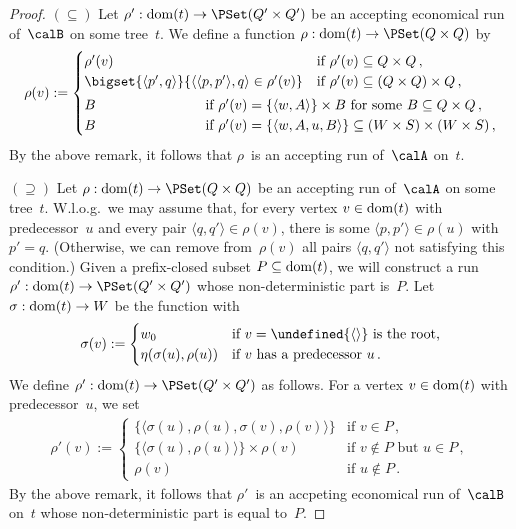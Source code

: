 \documentclass[10pt, fleqn]{scrartcl}
\makeatletter
\newcommand\m@thsm@ller[2]{\mbox{\relscale{0.91}$\m@th#1#2$}}
\let\smaller\undefined
\DeclareRobustCommand\smaller[1]{\relax\ifmmode{\mathpalette\m@thsm@ller{#1}}\else{\relscale{0.91}#1}\fi}
\DeclareRobustCommand*{\dom}{\qopname\relax o{dom}}
\newcommand*{\emptyseq}{\smaller{\langle\rangle}}
\newcommand*{\?}{\kern .08em}
\makeatother
\begin{document}
\begin{proof}
$(\subseteq)$ Let $\rho' : \dom(t) \to \PSet(Q' \times Q')$ be an accepting economical run
of~$\calB$ on some tree~$t$.
We define a function $\rho : \dom(t) \to \PSet(Q \times Q)$ by
\begin{align*}
  \rho(v) :=
    \begin{cases}
      \rho'(v) &\text{if } \rho'(v) \subseteq Q \times Q\,, \\
      \bigset{ \langle p',q\rangle }{ \langle\langle p,p'\rangle,q\rangle \in \rho'(v) }
               &\text{if } \rho'(v) \subseteq (Q \times Q) \times Q\,, \\[0.25em]
      B        &\mkern-144mu\text{if } \rho'(v) = \{\langle w,A\rangle\} \times B
                            \text{ for some } B \subseteq Q \times Q\,, \\
      B        &\mkern-144mu\text{if } \rho'(v) = \{\langle w,A,u,B\rangle\}
                                       \subseteq (W \times S) \times (W \times S)\,,
    \end{cases}
\end{align*}
By the above remark, it follows that $\rho$~is an accepting run of~$\calA$ on~$t$.

$(\supseteq)$
Let $\rho : \dom(t) \to \PSet(Q \times Q)$ be an accepting run of~$\calA$ on some tree~$t$.
W.l.o.g.\ we may assume that, for every vertex $v \in \dom(t)$ with predecessor~$u$
and every pair $\langle q,q'\rangle \in \rho(v)$, there is some $\langle p,p'\rangle \in \rho(u)$
with $p' = q$. (Otherwise, we can remove from~$\rho(v)$ all pairs $\langle q,q'\rangle$
not satisfying this condition.)
Given a prefix-closed subset $P \subseteq \dom(t)$, we will construct a run
$\rho' : \dom(t) \to \PSet(Q' \times Q')$ whose non-deterministic part is~$P$.
Let $\sigma : \dom(t) \to W$ be the function with
\begin{align*}
  \sigma(v) :=
    \begin{cases}
      w_0 &\text{if } v = \emptyseq \text{ is the root,} \\
      \eta(\sigma(u),\rho(u)) &\text{if } v \text{ has a predecessor } u\,.
    \end{cases}
\end{align*}
We define $\rho' : \dom(t) \to \PSet(Q' \times Q')$ as follows.
For a vertex $v \in \dom(t)$ with predecessor~$u$, we set
\begin{align*}
  \rho'(v) :=
    \begin{cases}
      \bigl\{\langle\sigma(u),\rho(u),\sigma(v),\rho(v)\rangle\bigr\} &\text{if } v \in P\,, \\
      \{\langle\sigma(u),\rho(u)\rangle\} \times \rho(v)
              &\text{if } v \notin P \text{ but } u \in P\,, \\
      \rho(v) &\text{if } u \notin P\,.
    \end{cases}
\end{align*}
By the above remark, it follows that $\rho'$~is an accpeting economical run of~$\calB$ on~$t$
whose non-deterministic part is equal to~$P$.


\end{proof}
\end{document}

